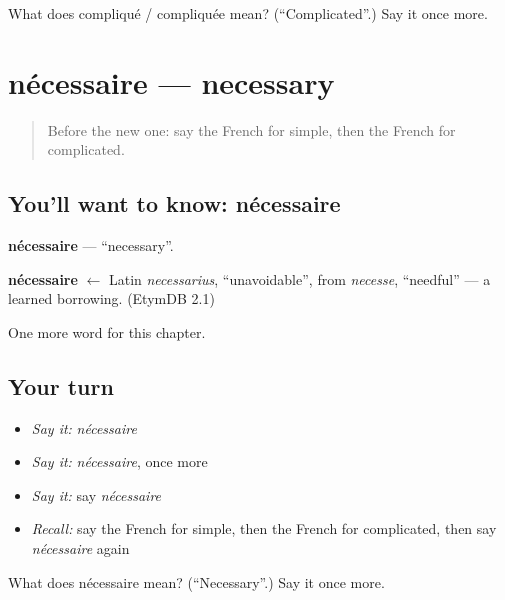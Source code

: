 \begin{tcolorbox}[breakable,colback=teal!4,colframe=teal!35!black,title={Before you move on}]
What does compliqué / compliquée mean? (\textquotedblleft{}Complicated\textquotedblright{}.) Say it once more.
\end{tcolorbox}
\section[nécessaire]{nécessaire — necessary}

\label{lesson:FR-C191-necessaire}



\begin{quote}
Before the new one: say the French for simple, then the French for complicated.
\end{quote}

\subsection*{You'll want to know: nécessaire}
\textbf{nécessaire} — \textquotedblleft{}necessary\textquotedblright{}.

\begin{cousinweb}
\textbf{nécessaire} $\leftarrow$ Latin \emph{necessarius}, \textquotedblleft{}unavoidable\textquotedblright{}, from \emph{necesse}, \textquotedblleft{}needful\textquotedblright{} — a learned borrowing. (EtymDB 2.1)
\end{cousinweb}

\begin{grammarlens}[title={What you've built}]
One more word for this chapter.
\end{grammarlens}

\subsection*{Your turn}
\begin{itemize}
\raggedright
  \item \emph{Say it:} \emph{nécessaire}
  \item \emph{Say it:} \emph{nécessaire}, once more
  \item \emph{Say it:} say \emph{nécessaire}
  \item \emph{Recall:} say the French for simple, then the French for complicated, then say \emph{nécessaire} again
\end{itemize}

\begin{tcolorbox}[breakable,colback=teal!4,colframe=teal!35!black,title={Before you move on}]
What does nécessaire mean? (\textquotedblleft{}Necessary\textquotedblright{}.) Say it once more.
\end{tcolorbox}
